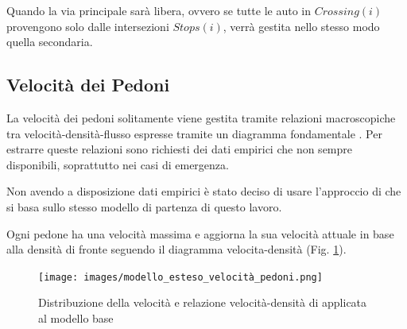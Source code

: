 Quando la via principale sarà libera, ovvero se tutte le auto in $\textit{Crossing}(i)$ provengono solo dalle intersezioni $\textit{Stops}(i)$, verrà gestita nello stesso modo quella secondaria.

\subsection{Velocità dei Pedoni}
La velocità dei pedoni solitamente viene gestita tramite relazioni macroscopiche tra velocità-densità-flusso
espresse tramite un diagramma fondamentale \parencite{nikolic2016probabilistic}.
Per estrarre queste relazioni sono richiesti dei dati empirici che non sempre disponibili, soprattutto nei casi di emergenza.

Non avendo a disposizione dati empirici è stato deciso di usare l'approccio di \textcite{wang2021novel}
che si basa sullo stesso modello di partenza di questo lavoro.

Ogni pedone ha una velocità massima e aggiorna la sua velocità attuale in base alla densità di fronte 
seguendo il diagramma velocita-densità (Fig. \ref{fig:modello-esteso-velocita-pedoni}).

\begin{figure}[ht]
    \centering
    \texttt{[image: images/modello\_esteso\_velocità\_pedoni.png]}
    \caption{Distribuzione della velocità e relazione velocità-densità di \textcite{wang2021novel} applicata al modello base}
    \label{fig:modello-esteso-velocita-pedoni}
\end{figure}
